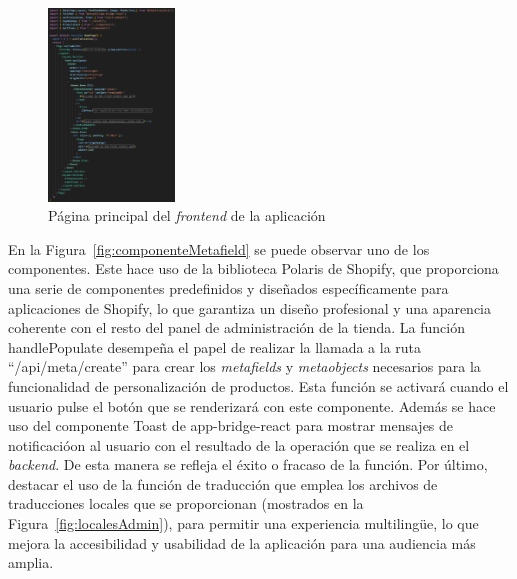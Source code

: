 \documentclass[12pt]{article}
\begin{document}
\begin{figure}[ht]
    \centering
    \includegraphics[width=0.3\textwidth]{imagenes-admin/paginaHome.png}
    \caption{\label{fig:homepage} Página principal del \textit{frontend} de la aplicación }
    \vspace{\fill}
\end{figure}

En la Figura~\ref{fig:componenteMetafield} se puede observar uno de los componentes. Este hace uso de la biblioteca Polaris de Shopify, que proporciona una serie de componentes predefinidos
y diseñados específicamente para aplicaciones de Shopify, lo que garantiza un diseño profesional y una aparencia coherente con el resto del panel de administración de la tienda.
La función handlePopulate desempeña el papel de realizar la llamada a la ruta ``/api/meta/create'' para crear los \textit{metafields} y \textit{metaobjects} necesarios para la funcionalidad de personalización de productos.
Esta función se activará cuando el usuario pulse el botón que se renderizará con este componente. Además se hace uso del componente Toast de app-bridge-react para mostrar
mensajes de notificacióon al usuario con el resultado de la operación que se realiza en el \textit{backend}. De esta manera se refleja el éxito o fracaso de la función. Por último, destacar el uso de la función
de traducción que emplea los archivos de traducciones locales que se proporcionan (mostrados en la Figura~\ref{fig:localesAdmin}), para permitir una experiencia multilingüe, lo que mejora
la accesibilidad y usabilidad de la aplicación para una audiencia más amplia.
\end{document}
